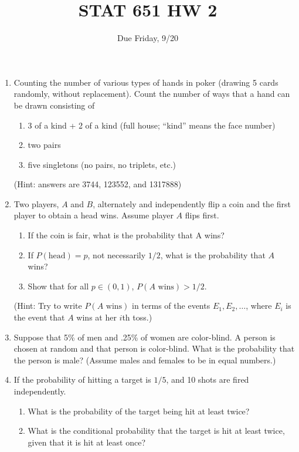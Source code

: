 \documentclass[12pt]{article}
\begin{document}
\title{STAT 651 HW 2}
\author{Due Friday, 9/20}
\date{}
\maketitle

\begin{enumerate}
\item
Counting the number of various types of hands in poker
(drawing 5 cards randomly, without replacement).
Count the number of ways that a hand can be drawn consisting of
    \begin{enumerate}
    \item 3 of a kind + 2 of a kind (full house; ``kind'' means the
        face number)
    \item two pairs
    \item five singletons (no pairs, no triplets, etc.)
    \end{enumerate}

    (Hint: answers are 3744, %
     123552, and 1317888)

\item
Two players, $A$ and $B$, alternately and independently flip a coin
and the first player to obtain a head wins.
Assume player $A$ flips first.
  \begin{enumerate}
  \item If the coin is fair, what is the probability that A wins?
  \item If $P(\text{head}) = p$, not necessarily $1/2$,
    what is the probability that $A$ wins?
  \item Show that for all $p \in (0, 1)$, $P(\text{$A$ wins}) > 1/2$.
  \end{enumerate}

  (Hint: Try to write $P(\text{$A$ wins})$
  in terms of the events $E_1, E_2,\dotsc$,
  where $E_i$ is the event that
  $A$ wins at her $i$th toss.)

\item
Suppose that 5\% of men and .25\% of women are color-blind.
A person is chosen at random and that person is color-blind.
What is the probability that the person is male?
(Assume males and females to be in equal numbers.)

\item
If the probability of hitting a target is $1/5$, and 10 shots are fired
independently.
    \begin{enumerate}
    \item
    What is the probability of the target being hit at least twice?
    \item
    What is the conditional probability that the target is hit at least twice,
    given that it is hit at least once?
    \end{enumerate}


\end{enumerate}
\end{document}
